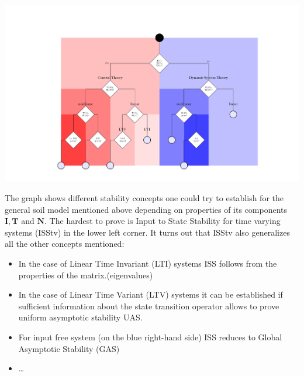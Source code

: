 
\includegraphics[width=\columnwidth,clip=true,trim=4.5cm 1cm 1cm 1cm]{Fig1.pdf}

\noindent
The graph shows different stability concepts one could try to establish for the
general soil model mentioned above depending on properties of its components 
$\mathbf{I},\mathbf{T}$ and $ \mathbf{N}$. The hardest to prove is Input to
State Stability for time varying systems (ISStv) in the lower left corner.  It
turns out that ISStv also generalizes all the other concepts mentioned:
\begin{itemize}
\item 
In the case of Linear Time Invariant (LTI) systems  ISS follows from the properties of the matrix.(eigenvalues)
\item 
In the case of Linear Time Variant (LTV) systems it can be established if sufficient information about the 
state transition operator allows to prove uniform asymptotic stability UAS.
\item
For input free system (on the blue right-hand side) ISS reduces to Global Asymptotic Stability (GAS)
\item
\dots

\end{itemize}

